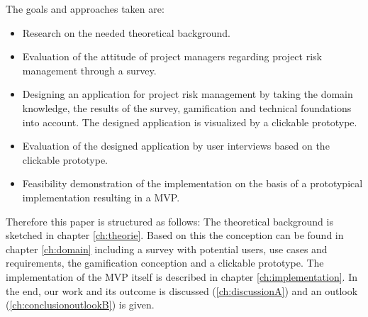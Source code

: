 The goals and approaches taken are:
\begin{itemize}
	\item Research on the needed theoretical background.
	\item Evaluation of the attitude of project managers regarding project risk management through a survey.
	\item Designing an application for project risk management by taking 
	the domain knowledge, the results of the survey, gamification and technical foundations into account. The designed application is visualized by a clickable prototype.
	\item Evaluation of the designed application by user interviews based on the clickable prototype.
	\item Feasibility demonstration of the implementation on the basis of a prototypical implementation resulting in a \ac{MVP}.
\end{itemize}

Therefore this paper is structured as follows:
The theoretical background is sketched in chapter \ref{ch:theorie}. Based on this the conception can be found in chapter \ref{ch:domain} including a survey with potential users, use cases and requirements, the gamification conception and a clickable prototype. The implementation of the \acs{MVP} itself is described in chapter \ref{ch:implementation}. In the end, our work and its outcome is discussed (\ref{ch:discussionA}) and an outlook (\ref{ch:conclusionoutlookB}) is given.


%
%

